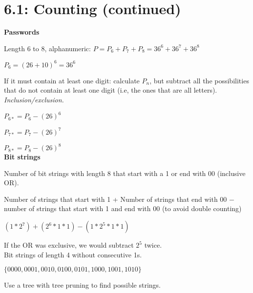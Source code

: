 \documentclass{exam}
\begin{document}
	
    \section{6.1: Counting (continued)}
    
    \textbf{Passwords}
    
    Length 6 to 8, alphanumeric: $P = P_6 + P_7 + P_8 = 36^6 + 36^7 + 36^8$  
    
    $P_6 = (26+10)^6 = 36^6$
    
    If it must contain at least one digit: calculate $P_n$, but subtract all the possibilities that do not contain at least one digit (i.e, the ones that are all letters). \textit{Inclusion/exclusion.}
    
    $P_{6*} = P_6 - (26)^6$
    
    $P_{7*} = P_7 - (26)^7$
    
    $P_{8*} = P_8 - (26)^8$\\
    
    \textbf{Bit strings}
    
    Number of bit strings with length 8 that start with a 1 or end with 00 (inclusive OR).
    
    Number of strings that start with 1 + Number of strings that end with 00 $-$ number of strings that start with 1 and end with 00 (to avoid double counting)
    
    $(1 * 2^7) + (2^6 * 1 * 1) - (1 * 2^5 * 1 * 1)$
    
    If the OR was exclusive, we would subtract $2^5$ twice.\\
    
    Bit strings of length 4 without consecutive 1s.
    
    $\{0000, 0001, 0010, 0100, 0101, 1000, 1001, 1010\}$
    
    Use a tree with tree pruning to find possible strings.
    
    
\end{document}
